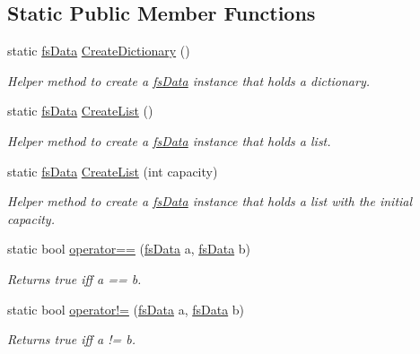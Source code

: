 \subsection*{Static Public Member Functions}
\begin{DoxyCompactItemize}
\item 
static \hyperlink{class_full_serializer_1_1fs_data}{fs\+Data} \hyperlink{class_full_serializer_1_1fs_data_a736d3ed458af91620f8eb47447f15233}{Create\+Dictionary} ()
\begin{DoxyCompactList}\small\item\em Helper method to create a \hyperlink{class_full_serializer_1_1fs_data}{fs\+Data} instance that holds a dictionary. \end{DoxyCompactList}\item 
static \hyperlink{class_full_serializer_1_1fs_data}{fs\+Data} \hyperlink{class_full_serializer_1_1fs_data_ac7c719ebad471a4a00b812097d436a73}{Create\+List} ()
\begin{DoxyCompactList}\small\item\em Helper method to create a \hyperlink{class_full_serializer_1_1fs_data}{fs\+Data} instance that holds a list. \end{DoxyCompactList}\item 
static \hyperlink{class_full_serializer_1_1fs_data}{fs\+Data} \hyperlink{class_full_serializer_1_1fs_data_a884600697b7b552fa3908e86b60e9216}{Create\+List} (int capacity)
\begin{DoxyCompactList}\small\item\em Helper method to create a \hyperlink{class_full_serializer_1_1fs_data}{fs\+Data} instance that holds a list with the initial capacity. \end{DoxyCompactList}\item 
static bool \hyperlink{class_full_serializer_1_1fs_data_a0cfc078433d539f5aefc16078accfc15}{operator==} (\hyperlink{class_full_serializer_1_1fs_data}{fs\+Data} a, \hyperlink{class_full_serializer_1_1fs_data}{fs\+Data} b)
\begin{DoxyCompactList}\small\item\em Returns true iff a == b. \end{DoxyCompactList}\item 
static bool \hyperlink{class_full_serializer_1_1fs_data_ae595530d43b82d4f7e6190b880932624}{operator!=} (\hyperlink{class_full_serializer_1_1fs_data}{fs\+Data} a, \hyperlink{class_full_serializer_1_1fs_data}{fs\+Data} b)
\begin{DoxyCompactList}\small\item\em Returns true iff a != b. \end{DoxyCompactList}\end{DoxyCompactItemize}
